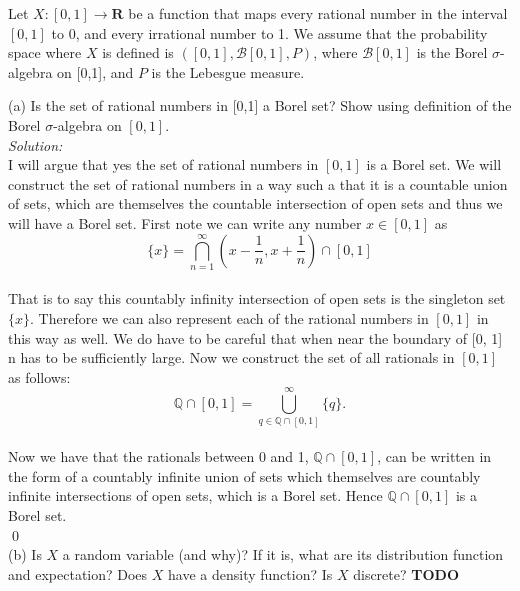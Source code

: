 \documentclass[10pt]{amsart}
\begin{document}
  Let $X: [0,1] \to \mathbf{R}$ be a function that maps every rational number in the interval $[0,1]$ to 0, and every irrational number to 1. We assume that the probability space where $X$ is defined is $([0,1],\mathcal{B}[0,1],P)$, where $\mathcal{B}[0,1]$ is the Borel $\sigma$-algebra on [0,1], and $P$ is the Lebesgue measure. 

(a) Is the set of rational numbers in [0,1] a Borel set? Show using definition of the Borel  $\sigma$-algebra on $[0,1]$. \\
\textit{Solution:} \\
I will argue that yes the set of rational numbers in $[0, 1]$ is a Borel set.
We will construct the set of rational numbers in a way such a that it is a countable union of sets, which are themselves the countable intersection of open sets and thus we will have a Borel set. First note we can write any number $x \in [0, 1]$ as \\
$$
\{x\} = \bigcap_{n=1}^{\infty} \left(x - \frac{1}{n}, x + \frac{1}{n}\right)\cap [0, 1]
$$
\\
That is to say this countably infinity intersection of open sets is the singleton set $\{x\}$.
Therefore we can also represent each of the rational numbers in $[0, 1]$ in this way as well.
We do have to be careful that when near the boundary of [0, 1] n has to be sufficiently large.
Now we construct the set of all rationals in $[0, 1]$ as follows: \\
$$
\mathbb{Q} \cap [0,1] = \bigcup_{q\in \mathbb{Q} \cap [0,1]}^\infty \{q\}.
$$ \\
Now we have that the rationals between 0 and 1, $\mathbb{Q} \cap [0, 1]$, can be written in the form of a countably infinite union of sets which themselves are countably infinite intersections of open sets, which is a Borel set. Hence $\mathbb{Q} \cap [0, 1]$ is a Borel set. \\
\qed
\\
(b) Is $X$ a random variable (and why)? If it is, what are its distribution function and expectation? Does $X$ have a density function? Is $X$ discrete?
\textbf{TODO}
\end{document}
